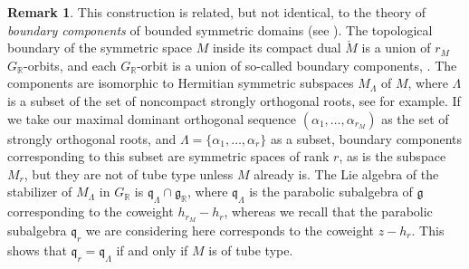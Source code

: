 \documentclass[JEP,XML,SOM,Unicode,NoFloatCountersInSection]{cedram}
\let\cites\cite
\newcommand{\citestar}[3]{\cite[#3]{#1}}
\theoremstyle{plain}
\theoremstyle{definition}
\newtheorem{rema}[theo]{Remark}
\let\rgy r
\newcommand{\bR}{\mathbb{R}}
\newcommand{\fgg}{\mathfrak{g}}
\newcommand{\fq}{\mathfrak{q}}
\newcommand{\rkm}{{r_M}}
\begin{document}
\begin{rema}\label{rema:boundary-components}
This construction is related, but not identical, to the theory of \emph{boundary components} of
bounded symmetric domains (see
\eg \cites{WolfFineStructure,piatetski-shapiro,Satake,AshMumfordRapoportTai}). The
topological boundary of the symmetric space $M$ inside its compact dual $\check{M}$ is a union
of $r_M$ $G_\bR$-orbits, and each $G_\bR$-orbit is a union of so-called boundary components,
\cf \citestar{AshMumfordRapoportTai}*{Def.\,3.2 p.\,127}. The
components are isomorphic to Hermitian symmetric subspaces $M_\Lambda$ of $M$, where
$\Lambda$ is a subset of the set of noncompact strongly orthogonal roots, see
\citestar{AshMumfordRapoportTai}*{Th.\,3.3 p.\,127} for example. If we take our maximal dominant
orthogonal sequence $(\alpha_1,\ldots,\alpha_\rkm)$ as the set of strongly orthogonal roots, and
$\Lambda=\{\alpha_1,\ldots,\alpha_\rgy\}$ as a subset, boundary components corresponding to this subset
are symmetric spaces of rank $\rgy$, as is the subspace $M_\rgy$,
but they are not of tube type unless $M$ already is. The Lie algebra of the stabilizer of
$M_\Lambda$ in $G_\bR$ is $\fq_\Lambda\cap\fgg_\bR$, where $\fq_\Lambda$ is the parabolic subalgebra of $\fgg$
corresponding to the coweight $h_\rkm-h_\rgy$, whereas we recall that the parabolic subalgebra
$\fq_\rgy$ we are considering here corresponds to the coweight $z-h_\rgy$. This shows that
$\fq_\rgy=\fq_\Lambda$ if and only if $M$ is of tube type.
\end{rema}
\end{document}
